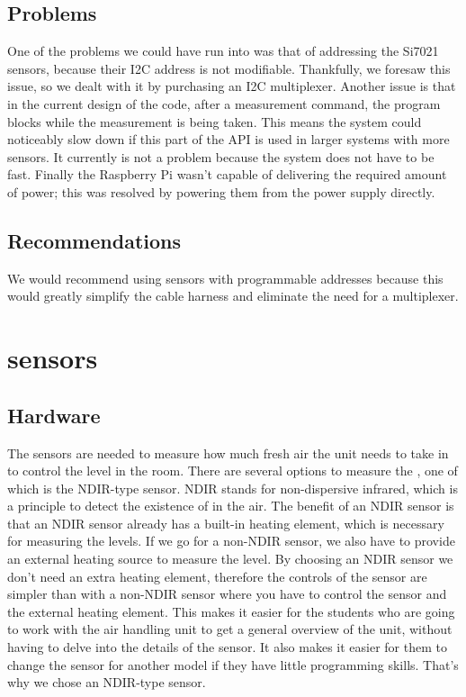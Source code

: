 \documentclass[a4paper,oneside]{book}
\begin{document}


\subsection{Problems}
One of the problems we could have run into was that of addressing the Si7021
sensors, because their I2C address is not modifiable. Thankfully, we foresaw
this issue, so we dealt with it by purchasing an I2C multiplexer. Another issue
is that in the current design of the code, after a measurement command, the
program blocks while the measurement is being taken. This means the system
could noticeably slow down if this part of the API is used in larger systems
with more sensors. It currently is not a problem because the system does not
have to be fast. Finally the Raspberry Pi wasn't capable of delivering the
required amount of power; this was resolved by powering them from the power
supply directly.

\subsection{Recommendations}
We would recommend using sensors with programmable addresses because this would
greatly simplify the cable harness and eliminate the need for a multiplexer.

\section{ sensors}
\subsection{Hardware}
The  sensors are needed to measure how much fresh air the unit needs to
take in to control the  level in the room.  There are several options
to measure the , one of which is the NDIR-type sensor. NDIR stands for
non-dispersive infrared, which is a principle to detect the existence of
 in the air. The benefit of an NDIR sensor is that an NDIR sensor
already has a built-in heating element, which is necessary for measuring the
 levels. If we go for a non-NDIR sensor, we also have to provide an
external heating source to measure the  level. By choosing an NDIR
sensor we don't need an extra heating element, therefore the controls of the
 sensor are simpler than with a non-NDIR sensor where you have to
control the sensor and the external heating element. This makes it easier for
the students who are going to work with the air handling unit to get a general
overview of the unit, without having to delve into the details of the 
sensor. It also makes it easier for them to change the sensor for another model
if they have little programming skills. That's why we chose an NDIR-type
 sensor.
\end{document}
